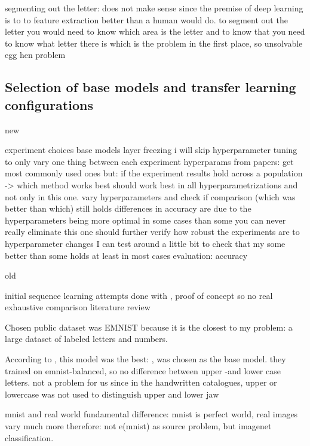 \documentclass{article}
\begin{document}
segmenting out the letter: does not make sense since the premise of deep learning is 
to to feature extraction better than a human would do. to segment out the letter you would 
need to know which area is the letter and to know that you need to know what letter there 
is which is the problem in the first place, so unsolvable egg hen problem

\subsection{Selection of base models and transfer learning configurations}

new

experiment choices 
    base models
    layer freezing 
    i will skip hyperparameter tuning to only vary one thing between each experiment 
        hyperparams from papers: get most commonly used ones
        but:
            if the experiment results hold across a population -> which method works best should work best in all 
                hyperparametrizations and not only in this one. vary hyperparameters and check if comparison 
                    (which was better than which) still holds
            differences in accuracy are due to the hyperparameters being more optimal in some cases than some 
                you can never really eliminate this 
                one should further verify how robust the experiments are to hyperparameter changes
                I can test around a little bit to check that my some better than some holds at least in most cases
    evaluation: accuracy

old

initial sequence learning attempts done with \cite{li2021trocr}, proof of concept so no real exhaustive comparison literature review

Chosen public dataset was EMNIST \cite{emnist} because it is the closest to my problem: a large dataset of labeled letters and numbers.

According to \cite{emnistclassifiersurvey}, this model was the best: \cite{jamilemnist}, was chosen as the base model.
they trained on emnist-balanced, so no difference between upper -and lower case letters. not a problem for us since 
in the handwritten catalogues, upper or lowercase was not used to distinguish upper and lower jaw

mnist and real world fundamental difference: mnist is perfect world, real images vary much more \cite{alexnet}
therefore: not e(mnist) as source problem, but imagenet classification.
\end{document}
